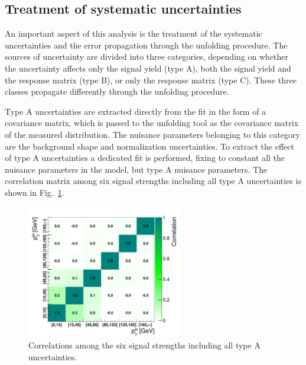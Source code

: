 \subsection{Treatment of systematic uncertainties}

An important aspect of this analysis is the treatment of the systematic
uncertainties and the error propagation through the unfolding procedure.
The sources of uncertainty are divided into three categories, depending
on whether the uncertainty affects only the signal yield (type A), both the signal
yield and the response matrix (type B), or only the response matrix (type C).
These three classes propagate differently through the unfolding procedure.

Type A uncertainties are extracted directly from the fit in the form of a covariance
matrix, which is passed to the unfolding tool as the covariance
matrix of the measured distribution. The nuisance parameters belonging to this category
are the background shape and normalization uncertainties.
To extract the effect of type A uncertainties a dedicated fit is performed,
fixing to constant all the nuisance parameters in the model, but type A nuisance parameters.
The correlation matrix among six signal strengths including all type A uncertainties is shown in Fig.~\ref{fig:typeA_corr}.

\begin{figure}[!h]
\centering
\includegraphics[width=0.6\textwidth]{images/typeACovMatrix.pdf}
\caption{Correlations among the six signal strengths including all type A uncertainties.}\label{fig:typeA_corr}
\end{figure}

